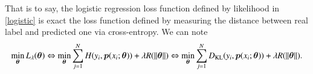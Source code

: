 That is to say, the logistic regression loss function defined by likelihood in \eqref{logistic} is exact
the loss function defined by measuring the distance between real label and predicted one via cross-entropy.
We can note 
\begin{equation}\label{key}
\min_{\bm \theta} L_\lambda(\bm \theta) \Leftrightarrow \min_{\bm \theta} \sum_{j=1}^N H(y_i, \bm p(x_i; \bm \theta)) + \lambda R(\|\bm \theta\|) 
\Leftrightarrow \min_{\bm \theta} \sum_{j=1}^N D_{\rm KL}(y_i, \bm p(x_i; \bm \theta)) + \lambda R(\|\bm \theta\|).
\end{equation}



\endinput